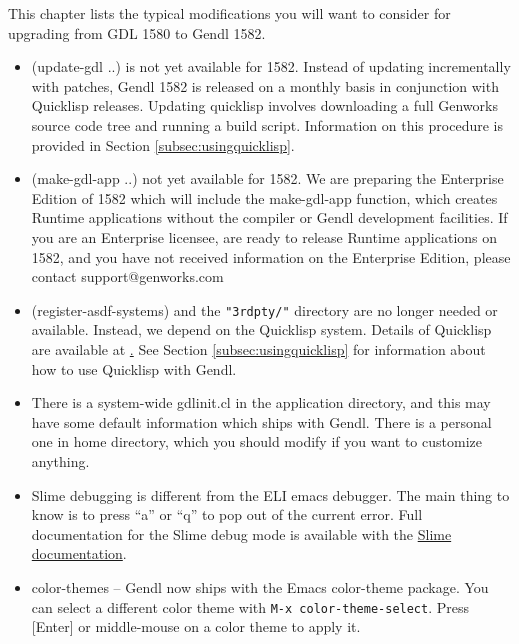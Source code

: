 \documentclass [11pt]{book}
\begin{document}
This chapter lists the typical modifications you will want to consider
for upgrading from GDL 1580 to Gendl 1582.

\begin{itemize}

\item (update-gdl ..) is not yet available for 1582. Instead
of updating incrementally with patches, Gendl 1582 is released on a
monthly basis in conjunction with Quicklisp releases.  Updating
quicklisp involves downloading a full Genworks source code tree and
running a build script. Information on this procedure is provided in
Section 
\ref{subsec:usingquicklisp}.

\item (make-gdl-app ..) not yet available for 1582. We are
preparing the Enterprise Edition of 1582 which will include the
make-gdl-app function, which creates Runtime applications without the
compiler or Gendl development facilities.  If you are an Enterprise
licensee, are ready to release Runtime applications on 1582, and you
have not received information on the Enterprise Edition, please
contact support@genworks.com

\item (register-asdf-systems) and the \texttt{"3rdpty/"} directory are no longer needed or available. Instead, we depend on the Quicklisp
system. Details of Quicklisp are available at \href{http://www.quicklisp.org}. See Section 
\ref{subsec:usingquicklisp} for information about how to use Quicklisp with Gendl.

\item There is a system-wide gdlinit.cl in the application
       directory, and this may have some default information which
       ships with Gendl. There is a personal one in home directory,
       which you should modify if you want to customize anything.

\item Slime debugging is different from the ELI emacs debugger. The main thing to know is 
to press ``a'' or ``q'' to pop out of the current error. Full documentation for the Slime debug mode
is available with the \href{http://common-lisp.net/project/slime/doc/html/Debugger.html}{Slime documentation}.

\item color-themes -- Gendl now ships with the Emacs
       color-theme package. You can select a different color theme with \texttt{M-x color-theme-select}. Press [Enter] or middle-mouse on a color theme to apply it.


\end{itemize}
\end{document}
